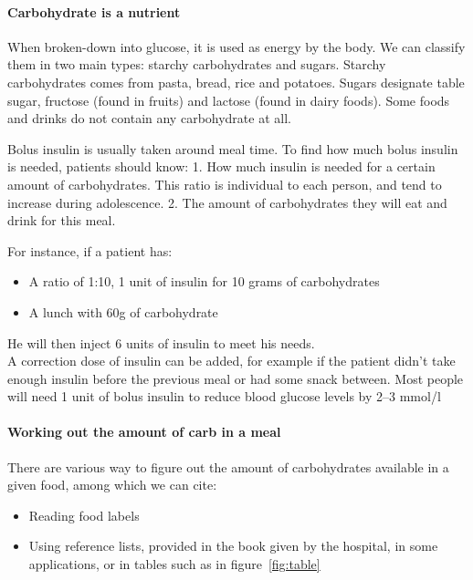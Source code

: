 \paragraph{Carbohydrate is a nutrient} When broken-down into glucose, it is used as energy by the body. We can classify them in two main types: starchy carbohydrates and sugars.
Starchy carbohydrates comes from pasta, bread, rice and potatoes. Sugars designate table sugar, fructose (found in fruits) and lactose (found in dairy foods). Some foods and drinks do not contain any carbohydrate at all.

Bolus insulin is usually taken around meal time. To find how much bolus insulin is needed, patients should know:
1. How much insulin is needed for a certain amount of carbohydrates. This ratio is individual to each person, and tend to increase during adolescence.
2. The amount of carbohydrates they will eat and drink for this meal.

For instance, if a patient has:
\begin{itemize}
\item A ratio of 1:10, 1 unit of insulin for 10 grams of carbohydrates
\item A lunch with 60g of carbohydrate
\end{itemize}

He will then inject 6 units of insulin to meet his needs. 
\\A correction dose of insulin can be added, for example if the patient didn't take enough insulin before the previous meal or had some snack between. Most people will need 1 unit of bolus insulin to reduce blood glucose levels by 2–3 mmol/l %
\paragraph{Working out the amount of carb in a meal}
There are various way to figure out the amount of carbohydrates available in a given food, among which we can cite:
\begin{itemize}
\item Reading food labels
\item Using reference lists, provided in the book given by the hospital, in some applications, or in tables such as in figure~\ref{fig:table}
\end{itemize}

